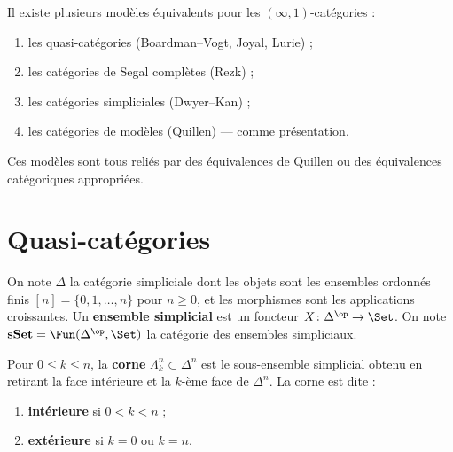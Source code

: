\begin{remarque}\label{rem:modeles-infty}
Il existe plusieurs modèles équivalents pour les $(\infty,1)$-catégories :
\begin{enumerate}[label=(\alph*)]
\item les quasi-catégories (Boardman--Vogt, Joyal, Lurie) ;
\item les catégories de Segal complètes (Rezk) ;
\item les catégories simpliciales (Dwyer--Kan) ;
\item les catégories de modèles (Quillen) --- comme présentation.
\end{enumerate}
Ces modèles sont tous reliés par des équivalences de Quillen ou
des équivalences catégoriques appropriées.
\end{remarque}

\section{Quasi-catégories}\label{sec:quasi-categories}


\begin{notation}\label{not:simplicial}
On note $\Delta$ la catégorie simpliciale dont les objets sont les
ensembles ordonnés finis $[n] = \{0, 1, \ldots, n\}$ pour $n \geq 0$,
et les morphismes sont les applications croissantes.
Un \textbf{ensemble simplicial} est un foncteur
$X \colon \Delta^\op \to \Set$.
On note $\mathbf{sSet} = \Fun(\Delta^\op, \Set)$ la catégorie
des ensembles simpliciaux.
\end{notation}

\begin{definition}[Corne]\label{def:corne}
Pour $0 \leq k \leq n$, la \textbf{corne}
$\Lambda^n_k \subset \Delta^n$ est le sous-ensemble simplicial
obtenu en retirant la face intérieure et la $k$-ème face de
$\Delta^n$.  La corne est dite :
\begin{enumerate}[label=(\roman*)]
\item \textbf{intérieure} si $0 < k < n$ ;
\item \textbf{extérieure} si $k = 0$ ou $k = n$.
\end{enumerate}
\end{definition}

